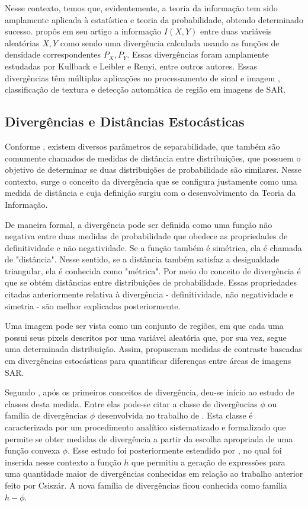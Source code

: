 Nesse contexto, temos que, evidentemente, a teoria da informação tem sido amplamente aplicada à estatística e teoria da probabilidade, obtendo determinado sucesso. \citet{Shannon48} propôs em seu artigo a informação $I(X,Y)$ entre duas variáveis aleatórias $X, Y$ como sendo uma divergência calculada usando as funções de densidade correspondentes $P_{X}, P_{Y}$. Essas divergências foram amplamente estudadas por Kullback e Leibler e Renyi, entre outros autores. Essas divergências têm múltiplas aplicações no processamento de sinal e imagem \citep{Aviyente}, classificação de textura e detecção automática de região em imagens de SAR.

\subsection{Divergências e Distâncias Estocásticas}

Conforme \citet{tese_abraao}, existem diversos parâmetros de separabilidade, que também são comumente chamados de medidas de distância entre distribuições, que possuem o objetivo de determinar se duas distribuições de probabilidade são similares. Nesse contexto, surge o conceito da divergência que se configura justamente como uma medida de distância e cuja definição surgiu com o desenvolvimento da Teoria da Informação. 

De maneira formal, a divergência pode ser definida como uma função não negativa entre duas medidas de probabilidade que obedece as propriedades de definitividade e não negatividade. Se a função também é simétrica, ela é chamada de "distância". Nesse sentido, se a distância também satisfaz a desigualdade triangular, ela é conhecida como "métrica". Por meio do conceito de divergência é que se obtém distâncias entre distribuições de probabilidade. Essas propriedades citadas anteriormente relativa à divergência - definitividade, não negatividade e simetria - são melhor explicadas posteriormente.

Uma imagem pode ser vista como um conjunto de regiões, em que cada uma possui seus pixels descritos por uma variável aleatória que, por sua vez, segue uma determinada distribuição. Assim, \citet{Nascimento2010} propuseram medidas de contraste baseadas em divergências estocásticas para quantificar diferenças entre áreas de imagens SAR. 

Segundo \citet{tese_abraao}, após os primeiros conceitos de divergência, deu-se início ao estudo de classes desta medida. Entre elas pode-se citar a classe de divergências $\phi$ ou família de divergências $\phi$ desenvolvida no trabalho de \citet{Csiszár67}. Esta classe é caracterizada por um procedimento analítico sistematizado e formalizado que permite se obter medidas de divergência a partir da escolha apropriada de uma função convexa $\phi$. Esse estudo foi posteriormente estendido por \citet{salicruetal1993}, no qual foi inserida nesse contexto a função $h$ que permitiu a geração de expressões para uma quantidade maior de divergências conhecidas em relação ao trabalho anterior feito por Csiszár. A nova família de divergências ficou conhecida como família $h - \phi$. 

